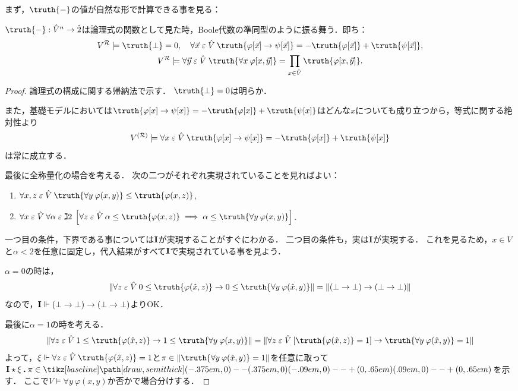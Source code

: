 \documentclass[realisability.tex]{subfiles}
\begin{document}
まず，$\truth{ - }$の値が自然な形で計算できる事を見る：
\begin{lemma}\label{lem:char-homo}
 $\truth{ - }: \hat{V}^n \to \hat{2}$は論理式の関数として見た時，Boole代数の準同型のように振る舞う．即ち：
 \begin{gather*}
  V^{\mathcal{R}} \models \truth{\bot} = 0, \quad \forall \vec{x} \strin \hat{V}\: \truth{\varphi[\vec{x}] \to \psi[\vec{x}]} = - \truth{\varphi[\vec{x}]} + \truth{\psi[\vec{x}]},\\
  V^{\mathcal{R}} \models \forall \vec{y} \strin \hat{V} \: \truth{\forall x \: \varphi[x, \vec{y}]} = \prod_{x \in \hat{V}} \truth{\varphi[x, \vec{y}]}.
 \end{gather*}
\end{lemma}
\begin{proof}
 論理式の構成に関する帰納法で示す．
 $\truth{\bot} = 0$は明らか．

 また，基礎モデルにおいては$\truth{ \varphi[x] \to \psi[x] } = -\truth{\varphi[x]} + \truth{\psi[x]}$はどんな$x$についても成り立つから，等式に関する絶対性より
 \[
  V^{(\mathcal{R})} \models \forall x \strin \hat{V} \: \truth{ \varphi[x] \to \psi[x] } = -\truth{\varphi[x]} + \truth{\psi[x]}
 \]
 は常に成立する．

 最後に全称量化の場合を考える．
 次の二つがそれぞれ実現されていることを見ればよい：
 \begin{enumerate}
  \item $\forall x, z \strin \hat{V} \: \truth{\forall y \: \varphi(x, y) } \leq \truth{\varphi(x, z)}$,
  \item $\forall x \strin \hat{V} \: \forall \alpha \strin \gimel 2\:
          \left[\forall z \strin \hat{V} \: \alpha \leq \truth{\varphi(x, z)}
            \implies \alpha \leq \truth{\forall y \: \varphi(x,y)}
          \right]$.
 \end{enumerate}
 一つ目の条件，下界である事については$\mathsf{\mathbf{I}}$が実現することがすぐにわかる．
 二つ目の条件も，実は$\mathsf{\mathbf{I}}$が実現する．
 これを見るため，$x \in V$と$\alpha < 2$を任意に固定し，代入結果がすべて$\mathsf{\mathbf{I}}$で実現されている事を見よう．

 $\alpha = 0$の時は，
 \[
  \|\forall z \strin \hat{V} \: 0 \leq \truth{\varphi(\hat{x}, z)}
 \to 0 \leq \truth{\forall y \: \varphi(\hat{x},y)}\| = \|(\bot \to \bot) \to (\bot \to \bot)\|
 \]
 なので，$\mathsf{\mathbf{I}} \Vdash (\bot \to \bot) \to (\bot \to \bot)$よりOK．

 最後に$\alpha = 1$の時を考える．
 \[
  \|\forall z \strin \hat{V} \: 1 \leq \truth{\varphi(\hat{x}, z)}
 \to 1 \leq \truth{\forall y \: \varphi(x,y)}\| =
 \|\forall z \strin \hat{V} \:[\truth{\varphi(\hat{x}, z)} = 1]
 \to \truth{\forall y \: \varphi(\hat{x},y)} = 1\|
 \]
 よって，$\xi \Vdash \forall z \strin \hat{V} \: \truth{\varphi(\hat{x},z)} = 1$と$\pi \in \|\truth{\forall y \: \varphi(\hat{x},y)} = 1\|$を任意に取って$\comb{I} \cons \xi \push \pi \in \pole$を示す．
 ここで$V \models \forall y \: \varphi(x,y)$か否かで場合分けする．


\end{proof}
\end{document}

